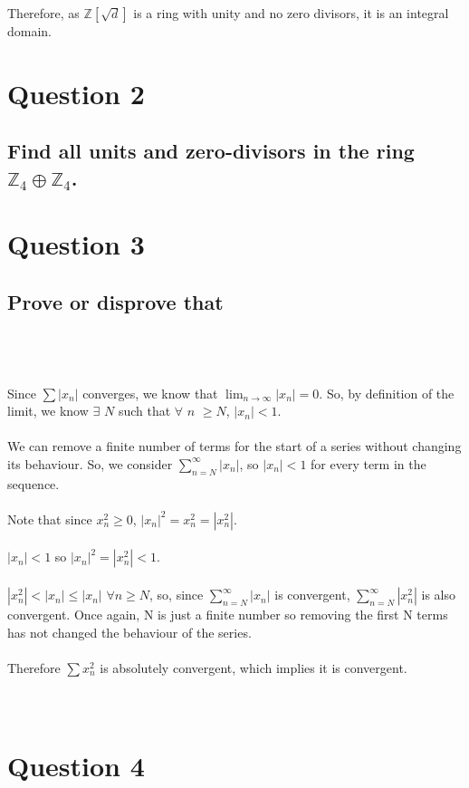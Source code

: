 \documentclass{article}
\begin{document}
Therefore, as \(\mathds{Z}[\sqrt{d}]\) is a ring with unity and no zero divisors, it is an integral domain.
\section*{Question 2}
\subsection*{Find all units and zero-divisors in the ring \(\mathds{Z}_4 \oplus \mathds{Z}_4\).}

\solution


\section*{Question 3}
\subsection*{Prove or disprove that}
\solution
\\
\\
\\
Since \(\sum |x_n|\) converges, we know that $\lim_{n\to\infty} |x_n|$\(=0\). So, by definition of the limit, we know \(\exists\) \(N\) such that \(\forall\) \(n\) \(\geq N\), \(|x_n| < 1\).
\\
\\
We can remove a finite number of terms for the start of a series without changing its behaviour. So, we consider \(\sum_{n=N}^{\infty} |x_n|\), so \(|x_n| < 1\) for every term in the sequence.
\\
\\
Note that since \(x_n^2 \geq 0\), \(|x_n|^2 = x_n^2 = |x_n^2|\). 
\\
\\
\(|x_n| < 1\) so \(|x_n|^2 = |x_n^2| < 1\).
\\
\\
\(|x_n^2| < |x_n| \leq |x_n|\) \(\forall n \geq N\), so, since \(\sum_{n=N}^{\infty} |x_n|\) is convergent, \(\sum_{n=N}^{\infty} |x_n^2|\) is also convergent. Once again, N is just a finite number so removing the first N terms has not changed the behaviour of the series.
\\
\\
Therefore \(\sum x_n^2\) is absolutely convergent, which implies it is convergent.
\\
\\
\\
\section*{Question 4}
\end{document}
